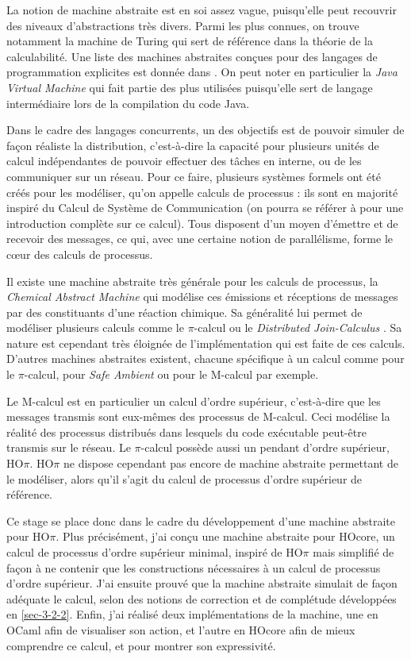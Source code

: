 \documentclass[11pt]{article}
\newcounter{c_theo}
\newcounter{c_def}
\begin{document}
La notion de machine abstraite est en soi assez vague, puisqu'elle peut recouvrir des niveaux d'abstractions très divers.
Parmi les plus connues, on trouve notamment la machine de Turing qui sert de référence dans la théorie de la calculabilité.
Une liste des machines abstraites conçues pour des langages de programmation explicites est donnée dans \cite{Diehl00}. On peut noter en particulier la \emph{Java Virtual Machine} qui fait partie des plus utilisées puisqu'elle sert de langage intermédiaire lors de la compilation du code Java.

Dans le cadre des langages concurrents, un des objectifs est de pouvoir simuler de façon réaliste la distribution, c'est-à-dire la capacité pour plusieurs unités de calcul indépendantes de pouvoir effectuer des tâches en interne, ou de les communiquer sur un réseau.
Pour ce faire, plusieurs systèmes formels ont été créés pour les modéliser, qu'on appelle calculs de processus : ils sont en majorité inspiré du Calcul de Système de Communication (on pourra se référer à \cite{Milner82} pour une introduction complète sur ce calcul).
Tous disposent d'un moyen d'émettre et de recevoir des messages, ce qui, avec une certaine notion de parallélisme, forme le c\oe ur des calculs de processus.

Il existe une machine abstraite très générale pour les calculs de processus, la \emph{Chemical Abstract Machine} \cite{Berry92} qui modélise ces émissions et réceptions de messages par des constituants d'une réaction chimique. Sa généralité lui permet de modéliser plusieurs calculs comme le $\pi$-calcul \cite{Gonthier96} ou le \emph{Distributed Join-Calculus} \cite{Fournet96}.
Sa nature est cependant très éloignée de l'implémentation qui est faite de ces calculs.
D'autres machines abstraites existent, chacune spécifique à un calcul comme \cite{Bidinger09} pour le $\pi$-calcul, \cite{Sangiorgi01} pour \emph{Safe Ambient} ou \cite{Germain02} pour le M-calcul par exemple.

Le M-calcul est en particulier un calcul d'ordre supérieur, c'est-à-dire que les messages transmis sont eux-mêmes des processus de M-calcul. Ceci modélise la réalité des processus distribués dans lesquels du code exécutable peut-être transmis sur le réseau.
Le $\pi$-calcul possède aussi un pendant d'ordre supérieur, HO$\pi$\cite{Sangiorgi93}.
HO$\pi$ ne dispose cependant pas encore de machine abstraite permettant de le modéliser, alors qu'il s'agit du calcul de processus d'ordre supérieur de référence.

Ce stage se place donc dans le cadre du développement d'une machine abstraite pour HO$\pi$. Plus précisément, j'ai conçu une machine abstraite pour HOcore\cite{Lanese08}, un calcul de processus d'ordre supérieur minimal, inspiré de HO$\pi$ mais simplifié de façon à ne contenir que les constructions nécessaires à un calcul de processus d'ordre supérieur.
J'ai ensuite prouvé que la machine abstraite simulait de façon adéquate le calcul, selon des notions de correction et de complétude développées en \ref{sec-3-2-2}.
Enfin, j'ai réalisé deux implémentations de la machine, une en OCaml afin de visualiser son action, et l'autre en HOcore afin de mieux comprendre ce calcul, et pour montrer son expressivité.
\end{document}

